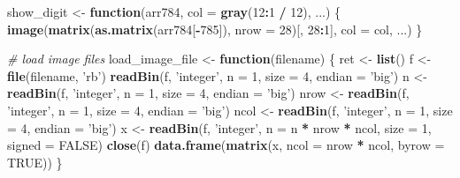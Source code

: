 \documentclass[]{book}
\newenvironment{Shaded}{\begin{snugshade}}{\end{snugshade}}
\newcommand{\KeywordTok}[1]{\textcolor[rgb]{0.13,0.29,0.53}{\textbf{#1}}}
\newcommand{\DataTypeTok}[1]{\textcolor[rgb]{0.13,0.29,0.53}{#1}}
\newcommand{\DecValTok}[1]{\textcolor[rgb]{0.00,0.00,0.81}{#1}}
\newcommand{\StringTok}[1]{\textcolor[rgb]{0.31,0.60,0.02}{#1}}
\newcommand{\CommentTok}[1]{\textcolor[rgb]{0.56,0.35,0.01}{\textit{#1}}}
\newcommand{\OtherTok}[1]{\textcolor[rgb]{0.56,0.35,0.01}{#1}}
\newcommand{\ControlFlowTok}[1]{\textcolor[rgb]{0.13,0.29,0.53}{\textbf{#1}}}
\newcommand{\OperatorTok}[1]{\textcolor[rgb]{0.81,0.36,0.00}{\textbf{#1}}}
\newcommand{\NormalTok}[1]{#1}
\theoremstyle{definition}
\theoremstyle{definition}
\theoremstyle{definition}
\theoremstyle{remark}
\begin{document}
\begin{Shaded}
\begin{Highlighting}[]
\NormalTok{show_digit <-}\StringTok{ }\ControlFlowTok{function}\NormalTok{(arr784, }\DataTypeTok{col =} \KeywordTok{gray}\NormalTok{(}\DecValTok{12}\OperatorTok{:}\DecValTok{1} \OperatorTok{/}\StringTok{ }\DecValTok{12}\NormalTok{), ...) \{}
  \KeywordTok{image}\NormalTok{(}\KeywordTok{matrix}\NormalTok{(}\KeywordTok{as.matrix}\NormalTok{(arr784[}\OperatorTok{-}\DecValTok{785}\NormalTok{]), }\DataTypeTok{nrow =} \DecValTok{28}\NormalTok{)[, }\DecValTok{28}\OperatorTok{:}\DecValTok{1}\NormalTok{], }\DataTypeTok{col =}\NormalTok{ col, ...)}
\NormalTok{\}}

\CommentTok{# load image files}
\NormalTok{load_image_file <-}\StringTok{ }\ControlFlowTok{function}\NormalTok{(filename) \{}
\NormalTok{  ret <-}\StringTok{ }\KeywordTok{list}\NormalTok{()}
\NormalTok{  f <-}\StringTok{ }\KeywordTok{file}\NormalTok{(filename, }\StringTok{'rb'}\NormalTok{)}
  \KeywordTok{readBin}\NormalTok{(f, }\StringTok{'integer'}\NormalTok{, }\DataTypeTok{n =} \DecValTok{1}\NormalTok{, }\DataTypeTok{size =} \DecValTok{4}\NormalTok{, }\DataTypeTok{endian =} \StringTok{'big'}\NormalTok{)}
\NormalTok{  n    <-}\StringTok{ }\KeywordTok{readBin}\NormalTok{(f, }\StringTok{'integer'}\NormalTok{, }\DataTypeTok{n =} \DecValTok{1}\NormalTok{, }\DataTypeTok{size =} \DecValTok{4}\NormalTok{, }\DataTypeTok{endian =} \StringTok{'big'}\NormalTok{)}
\NormalTok{  nrow <-}\StringTok{ }\KeywordTok{readBin}\NormalTok{(f, }\StringTok{'integer'}\NormalTok{, }\DataTypeTok{n =} \DecValTok{1}\NormalTok{, }\DataTypeTok{size =} \DecValTok{4}\NormalTok{, }\DataTypeTok{endian =} \StringTok{'big'}\NormalTok{)}
\NormalTok{  ncol <-}\StringTok{ }\KeywordTok{readBin}\NormalTok{(f, }\StringTok{'integer'}\NormalTok{, }\DataTypeTok{n =} \DecValTok{1}\NormalTok{, }\DataTypeTok{size =} \DecValTok{4}\NormalTok{, }\DataTypeTok{endian =} \StringTok{'big'}\NormalTok{)}
\NormalTok{  x <-}\StringTok{ }\KeywordTok{readBin}\NormalTok{(f, }\StringTok{'integer'}\NormalTok{, }\DataTypeTok{n =}\NormalTok{ n }\OperatorTok{*}\StringTok{ }\NormalTok{nrow }\OperatorTok{*}\StringTok{ }\NormalTok{ncol, }\DataTypeTok{size =} \DecValTok{1}\NormalTok{, }\DataTypeTok{signed =} \OtherTok{FALSE}\NormalTok{)}
  \KeywordTok{close}\NormalTok{(f)}
  \KeywordTok{data.frame}\NormalTok{(}\KeywordTok{matrix}\NormalTok{(x, }\DataTypeTok{ncol =}\NormalTok{ nrow }\OperatorTok{*}\StringTok{ }\NormalTok{ncol, }\DataTypeTok{byrow =} \OtherTok{TRUE}\NormalTok{))}
\NormalTok{\}}


\end{Highlighting}
\end{Shaded}
\end{document}
